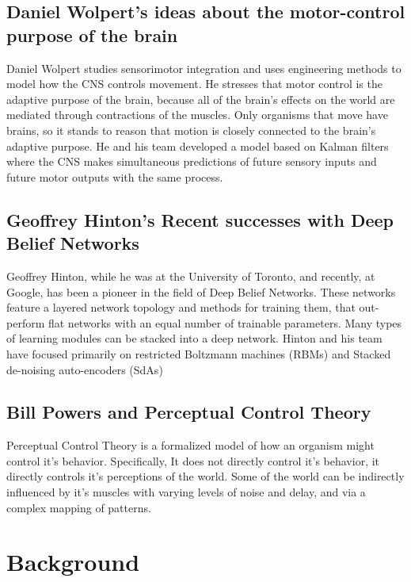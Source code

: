 \documentclass[12pt]{article}
\begin{document}

	\subsection{Daniel Wolpert's ideas about the motor-control purpose of the brain}
	
Daniel Wolpert studies sensorimotor integration and uses engineering methods to model how the CNS controls movement. He stresses that motor control is the adaptive purpose of the brain, because all of the brain's effects on the world are mediated through contractions of the muscles. Only organisms that move have brains, so it stands to reason that motion is closely connected to the brain's adaptive purpose. He and his team developed a model based on Kalman filters where the CNS makes simultaneous predictions of future sensory inputs and future motor outputs with the same process.

	
	\subsection{Geoffrey Hinton's Recent successes with Deep Belief Networks}
	
Geoffrey Hinton, while he was at the University of Toronto, and recently, at Google, has been a pioneer in the field of Deep Belief Networks. These networks feature a layered network topology and methods for training them, that out-perform flat networks with an equal number of trainable parameters. Many types of learning modules can be stacked into a deep network. Hinton and his team have focused primarily on restricted Boltzmann machines (RBMs) and Stacked de-noising auto-encoders (SdAs)


	\subsection{Bill Powers and Perceptual Control Theory}

Perceptual Control Theory is a formalized model of how an organism might control it's behavior. Specifically, It does not directly control it's behavior, it directly controls it's perceptions of the world. Some of the world can be indirectly influenced by it's muscles with varying levels of noise and delay, and via a complex mapping of patterns.

		
\section{Background}
\end{document}
